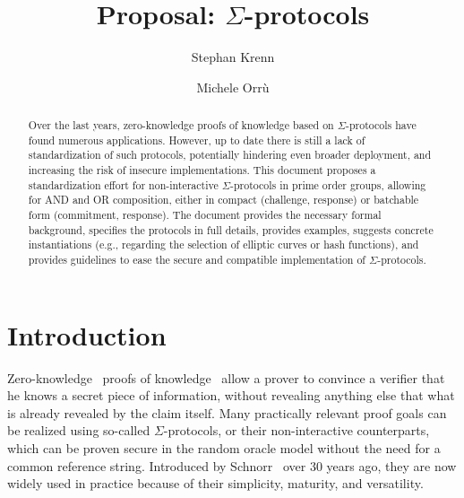 \documentclass[runningheads]{llncs}
\newif\ifanonymous
\begin{document}
\title{Proposal: $\Sigma$-protocols}
%

\ifanonymous
\author{}
\institute{}
\else
\author{Stephan Krenn \and
        Michele Orr\`u}

\fi
%
\maketitle              %
%
\begin{abstract}
  Over the last years, zero-knowledge proofs of knowledge based on $\Sigma$-protocols have found numerous applications.
  However, up to date there is still a lack of standardization of such protocols, potentially hindering even broader deployment, and increasing the risk of insecure implementations. 
  This document proposes a standardization effort for non-interactive $\Sigma$-protocols in prime order groups, allowing for AND and OR composition, either in compact (challenge, response) or batchable form (commitment, response). 
  The document provides the necessary formal background, specifies the protocols in full details, provides examples, suggests concrete instantiations (e.g., regarding the selection of elliptic curves or hash functions), and provides guidelines to ease the secure and compatible implementation of $\Sigma$-protocols.

\end{abstract}

\section{Introduction}

Zero-knowledge~\cite{GolMicRac89} proofs of knowledge~\cite{C:BelGol92} allow a prover to convince a verifier that he knows a secret piece of information, without revealing anything else that what is already revealed by the claim itself.
Many practically relevant proof goals can be realized using so-called $\Sigma$-protocols, or their non-interactive counterparts, which can be proven secure in the random oracle model without the need for a common reference string.
Introduced by Schnorr~\cite{JC:Schnorr91} over 30 years ago, they are now widely used  in practice because of their simplicity, maturity, and versatility.
\end{document}
